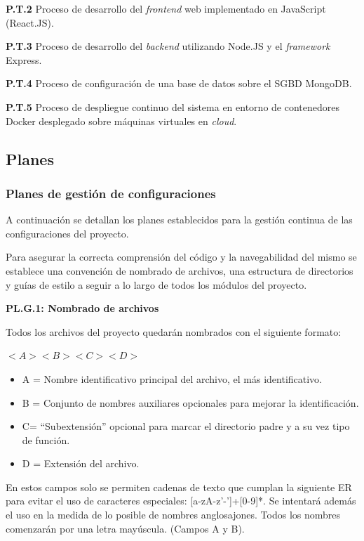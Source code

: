 \documentclass{article}
\begin{document}
\textbf{P.T.2} Proceso de desarrollo del \textit{frontend} web implementado en JavaScript (React.JS).

\textbf{P.T.3} Proceso de desarrollo del \textit{backend} utilizando Node.JS y el \textit{framework} Express.

\textbf{P.T.4} Proceso de configuración de una base de datos sobre el SGBD MongoDB.

\textbf{P.T.5} Proceso de despliegue continuo del sistema en entorno de contenedores Docker desplegado sobre máquinas virtuales en \textit{cloud}.

\pagebreak
\subsection{Planes}

\subsubsection{Planes de gestión de configuraciones}
A continuación se detallan los planes establecidos para la gestión continua de las configuraciones del 
proyecto.

Para asegurar la correcta comprensión del código y la navegabilidad del mismo se establece una convención de nombrado de archivos, una estructura de directorios y guías de estilo a seguir a lo largo de todos los 
módulos del proyecto.

\textbf{PL.G.1: Nombrado de archivos}

Todos los archivos del proyecto quedarán nombrados con el siguiente formato:

$<A><B><C><D>$

\begin{itemize}
    \setlength{\itemsep}{0em} %
    \item A = Nombre identificativo principal del archivo, el más identificativo.
    \item B = Conjunto de nombres auxiliares opcionales para mejorar la identificación.
    \item C= “Subextensión” opcional para marcar el directorio padre y a su vez tipo de función.
    \item D = Extensión del archivo.
\end{itemize}

En estos campos solo se permiten cadenas de texto que cumplan la siguiente ER para evitar el uso de  caracteres especiales: [a-zA-z'-']+[0-9]*. Se intentará además el uso en la medida de lo posible de nombres anglosajones. Todos los nombres comenzarán por una letra mayúscula. (Campos A y B).
\end{document}
